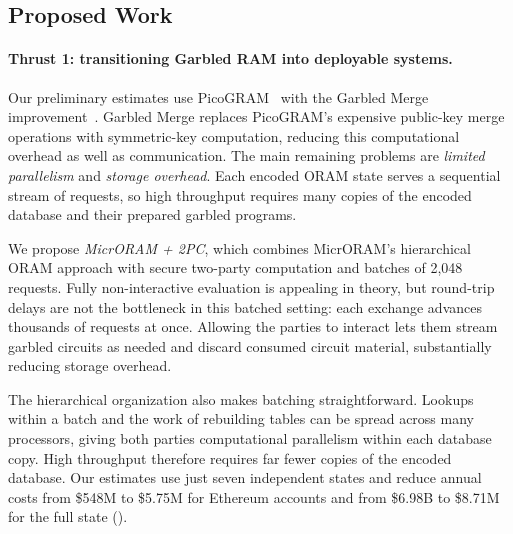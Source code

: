 

\subsection{Proposed Work}
\label{sec:proposed}

\paragraph{Thrust 1: transitioning Garbled RAM into deployable systems.}
Our preliminary estimates use PicoGRAM~\cite{picogram} with the
Garbled Merge improvement~\cite{garbledmerge}. Garbled Merge
replaces PicoGRAM's expensive public-key merge operations with
symmetric-key computation, reducing this computational overhead as well
as communication. The main remaining problems are \emph{limited
parallelism} and \emph{storage overhead}. Each encoded ORAM state serves
a sequential stream of requests, so high throughput requires many copies
of the encoded database and their prepared garbled programs.

We propose \emph{MicrORAM + 2PC}, which combines MicrORAM's hierarchical
ORAM approach with secure two-party computation and batches of 2,048
requests. Fully non-interactive evaluation is appealing in theory, but
round-trip delays are not the bottleneck in this batched setting: each
exchange advances thousands of requests at once. Allowing the parties
to interact lets them stream garbled circuits as needed and discard
consumed circuit material, substantially reducing storage overhead.

The hierarchical organization also makes batching straightforward.
Lookups within a batch and the work of rebuilding tables can be spread
across many processors, giving both parties computational parallelism
within each database copy. High throughput therefore requires far fewer
copies of the encoded database. Our estimates use just seven independent
states and reduce annual costs from \$548M to \$5.75M for Ethereum accounts
and from \$6.98B to \$8.71M for the full state ().

